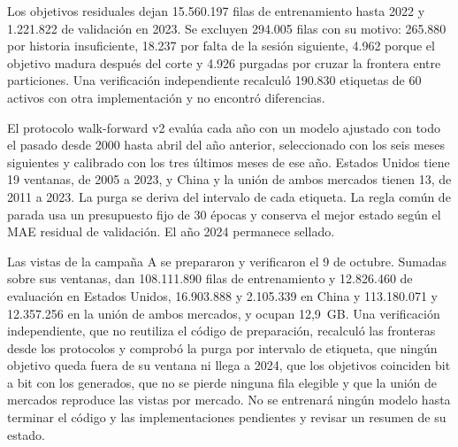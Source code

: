 \documentclass[11pt,a4paper]{report}
\begin{document}
Los objetivos residuales dejan 15.560.197 filas de entrenamiento hasta 2022 y
1.221.822 de validación en 2023. Se excluyen 294.005 filas con su motivo:
265.880 por historia insuficiente, 18.237 por falta de la sesión siguiente,
4.962 porque el objetivo madura después del corte y 4.926 purgadas por cruzar
la frontera entre particiones. Una verificación independiente recalculó
190.830 etiquetas de 60 activos con otra implementación y no encontró
diferencias.

El protocolo walk-forward v2 evalúa cada año con un modelo ajustado con todo el
pasado desde 2000 hasta abril del año anterior, seleccionado con los seis meses
siguientes y calibrado con los tres últimos meses de ese año. Estados Unidos
tiene 19 ventanas, de 2005 a 2023, y China y la unión de ambos mercados
tienen 13, de 2011 a 2023. La purga se deriva del intervalo de cada etiqueta.
La regla común de parada usa un presupuesto fijo de 30 épocas y conserva el
mejor estado según el MAE residual de validación. El año 2024 permanece
sellado.

Las vistas de la campaña A se prepararon y verificaron el 9 de octubre. Sumadas
sobre sus ventanas, dan 108.111.890 filas de entrenamiento y 12.826.460 de
evaluación en Estados Unidos, 16.903.888 y 2.105.339 en China y 113.180.071 y
12.357.256 en la unión de ambos mercados, y ocupan 12,9~GB. Una verificación
independiente, que no reutiliza el código de preparación, recalculó las
fronteras desde los protocolos y comprobó la purga por intervalo de etiqueta,
que ningún objetivo queda fuera de su ventana ni llega a 2024, que los
objetivos coinciden bit a bit con los generados, que no se pierde ninguna fila
elegible y que la unión de mercados reproduce las vistas por mercado. No se
entrenará ningún modelo hasta terminar el código y las implementaciones
pendientes y revisar un resumen de su estado.
\end{document}
